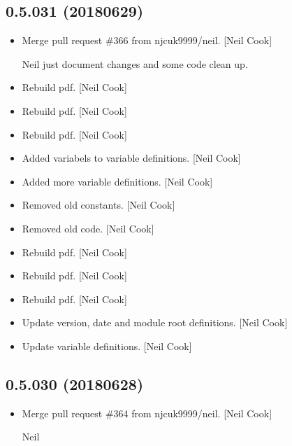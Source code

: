 \documentclass[a4paper,10pt,english]{report}
\begin{document}
\subsection{0.5.031 (2018\sphinxhyphen{}06\sphinxhyphen{}29)}
\label{\detokenize{misc/changelog:id423}}\begin{itemize}
\item {} 
Merge pull request \#366 from njcuk9999/neil. {[}Neil Cook{]}

Neil \sphinxhyphen{} just document changes and some code clean up.

\item {} 
Rebuild pdf. {[}Neil Cook{]}

\item {} 
Rebuild pdf. {[}Neil Cook{]}

\item {} 
Rebuild pdf. {[}Neil Cook{]}

\item {} 
Added variabels to  variable definitions. {[}Neil Cook{]}

\item {} 
Added more  variable definitions. {[}Neil Cook{]}

\item {} 
Removed old  constants. {[}Neil Cook{]}

\item {} 
Removed old  code. {[}Neil Cook{]}

\item {} 
Rebuild pdf. {[}Neil Cook{]}

\item {} 
Rebuild pdf. {[}Neil Cook{]}

\item {} 
Rebuild pdf. {[}Neil Cook{]}

\item {} 
Update version, date and module root definitions. {[}Neil Cook{]}

\item {} 
Update variable definitions. {[}Neil Cook{]}

\end{itemize}


\subsection{0.5.030 (2018\sphinxhyphen{}06\sphinxhyphen{}28)}
\label{\detokenize{misc/changelog:id424}}\begin{itemize}
\item {} 
Merge pull request \#364 from njcuk9999/neil. {[}Neil Cook{]}

Neil

\end{itemize}
\end{document}
